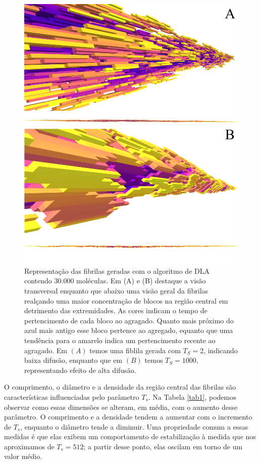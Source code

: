 \documentclass{article}
\begin{document}
    \begin{figure}[H]
        \centering
        \includegraphics[width=\textwidth]{figures/fibrils.png}

        \caption{Representação das fibrilas geradas com o algoritmo de DLA contendo $30.000$ moléculas. 
        Em (A) e (B) destaque a visão transversal enquanto que abaixo uma visão geral da fibrilas realçando 
        uma maior concentração de blocos na região central em detrimento das extremidades. As cores indicam 
        o tempo de pertencimento de cada bloco ao agragado. Quanto mais próximo do azul mais antigo esse 
        bloco pertence ao agregado, equanto que uma tendência para o amarelo indica um pertencimento recente 
        ao agragado. Em $(A)$ temos uma fiblila gerada com $T_{S}=2$, indicando baixa difusão, enquanto que 
        em $(B)$ temos  $T_{S}=1000$, representando efeito de alta difusão.} 

        \label{R1}
    \end{figure}

    O comprimento, o diâmetro e a densidade da região central das fibrilas são características influenciadas pelo 
    parâmetro \(T_{s}\). Na Tabela \ref{tab1}, podemos observar como essas dimensões se alteram, em média, com o 
    aumento desse parâmetro. O comprimento e a densidade tendem a aumentar com o incremento de \(T_{s}\), enquanto 
    o diâmetro tende a diminuir. Uma propriedade comum a essas medidas é que elas exibem um comportamento de 
    estabilização à medida que nos aproximamos de \(T_{s} = 512\); a partir desse ponto, elas oscilam em torno de um 
    valor médio. 
\end{document}
